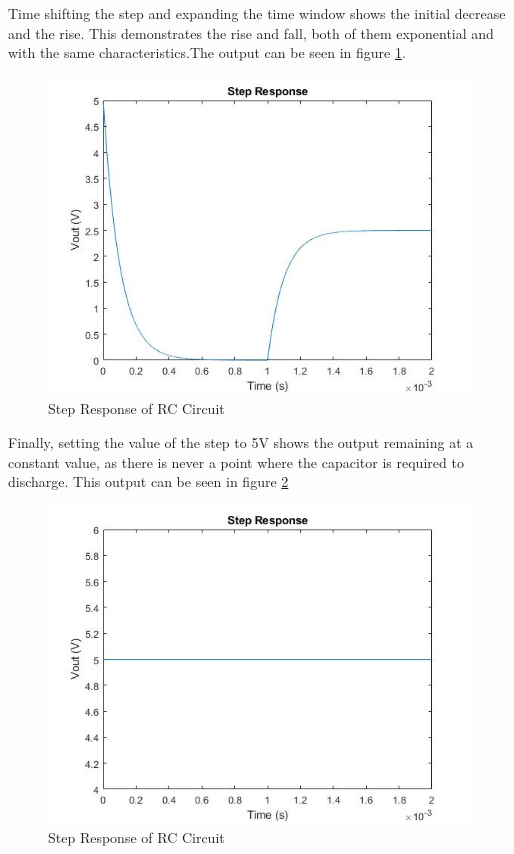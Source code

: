 \documentclass[11pt, oneside, titlepage]{article}   	%
\begin{document}
Time shifting the step and expanding the time window shows the initial decrease and the rise. This demonstrates the rise and fall, both of them exponential and with the same characteristics.The output can be seen in figure \ref{fig:ex1_2}. 

\begin{figure}[H]
\center
\includegraphics[scale = 0.5]{exercise1_2}
\caption{Step Response of RC Circuit} \label{fig:ex1_2}
\end{figure}

Finally, setting the value of the step to 5V shows the output remaining at a constant value, as there is never a point where the capacitor is required to discharge. This output can be seen in figure \ref{fig:ex1_3}

\begin{figure}[H]
\center
\includegraphics[scale = 0.5]{exercise1_3}
\caption{Step Response of RC Circuit} \label{fig:ex1_3}
\end{figure}
\end{document}

